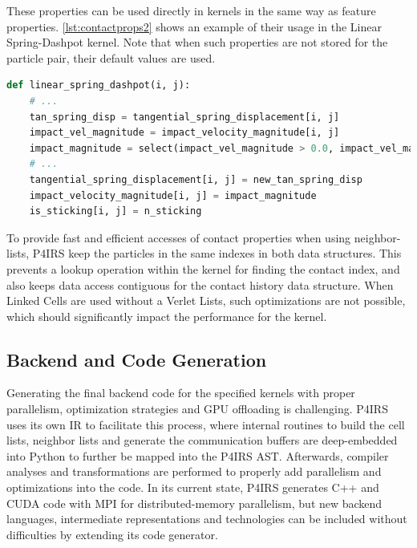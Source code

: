 \documentclass[preprint,12pt]{elsarticle}
\begin{document}
These properties can be used directly in kernels in the same way as feature properties.
\autoref{lst:contactprops2} shows an example of their usage in the Linear Spring-Dashpot kernel.
Note that when such properties are not stored for the particle pair, their default values are used.

\begin{lstlisting}[language=Python,
		   label={lst:contactprops2},
		   caption={Usage example for contact properties.}]
def linear_spring_dashpot(i, j):
    # ...
    tan_spring_disp = tangential_spring_displacement[i, j]
    impact_vel_magnitude = impact_velocity_magnitude[i, j]
    impact_magnitude = select(impact_vel_magnitude > 0.0, impact_vel_magnitude, length(rel_vel))
    # ...
    tangential_spring_displacement[i, j] = new_tan_spring_disp
    impact_velocity_magnitude[i, j] = impact_magnitude
    is_sticking[i, j] = n_sticking
\end{lstlisting}

To provide fast and efficient accesses of contact properties when using neighbor-lists, P4IRS keep the particles in the same indexes in both data structures.
This prevents a lookup operation within the kernel for finding the contact index, and also keeps data access contiguous for the contact history data structure.
When Linked Cells are used without a Verlet Lists, such optimizations are not possible, which should significantly impact the performance for the kernel.


\subsection{Backend and Code Generation}
\label{sec:backend}

Generating the final backend code for the specified kernels with proper parallelism, optimization strategies and GPU offloading is challenging.
P4IRS uses its own \ac{IR} to facilitate this process, where internal routines to build the cell lists, neighbor lists and generate the communication buffers are deep-embedded into Python to further be mapped into the P4IRS \ac{AST}.
Afterwards, compiler analyses and transformations are performed to properly add parallelism and optimizations into the code.
In its current state, P4IRS generates C++ and CUDA code with MPI for distributed-memory parallelism, but new backend languages, intermediate representations and technologies can be included without difficulties by extending its code generator.
\end{document}
